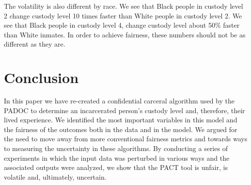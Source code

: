 \documentclass{amsproc}
\numberwithin{equation}{section}
\theoremstyle{plain}
\theoremstyle{remark}
\begin{document}
The volatility is also different by race.  We see that Black people in custody level 2 change custody level 10 times faster than White people in custody level 2.  We see that Black people in custody level 4, change custody level about 50\% faster than White inmates.  In order to achieve fairness, these numbers should not be as different as they are.




\section{Conclusion}  In this paper we have re-created a confidential carceral algorithm used by the PADOC to determine an incarcerated person's custody level and, therefore, their lived experience.  We identified the most important variables in this model and the fairness of the outcomes both in the data and in the model.  We argued for the need to move away from more conventional fairness metrics and towards ways to measuring the uncertainty in these algorithms.  By conducting a series of experiments in which the input data was perturbed in various ways and the associated outputs were analyzed, we show that the PACT tool is unfair, is volatile and, ultimately, uncertain.




   
\end{document}
